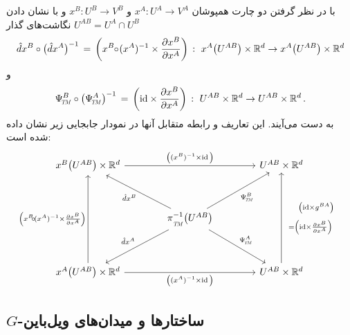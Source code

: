 با در نظر گرفتن دو چارت همپوشان $x^A: U^A \to V^A$ و $x^B: U^B \to V^B$ و با نشان دادن $U^{AB} = U^A \cap U^B$ نگاشت‌های گذار
\begin{align}
	\hat{d}x^B \circ \big( \hat{d}x^A \big)^{-1} \,=\,
	\left( x^B \mkern-5mu\circ\mkern-3mu (x^A)^{-1} \times \frac{\partial x^B}{\partial x^A} \right)
	\,:\ x^A\big( U^{AB}\big) \times \mathbb{R}^d \to x^A\big( U^{AB}\big) \times \mathbb{R}^d
\end{align}
و
\begin{align}
	\PsiTM^B \circ \big( \PsiTM^A \big)^{-1} \,=\,
	\left( \id \times \frac{\partial x^B}{\partial x^A} \right)
	\,:\ U^{AB} \times \R^d \to U^{AB} \times \R^d \,.
\end{align}
به دست می‌آیند. این تعاریف و رابطه متقابل آنها در نمودار جابجایی زیر نشان داده شده است:
\begin{equation}\label{cd:coordinate_basis_bundle_trivialization_transition}
	\begin{tikzcd}[row sep=3.5em, column sep=4em]
		x^B\big(U^{AB}\big) \times \R^d
		\arrow[rr, "{\big( (x^B)^{-1} \times \id \,\big)}"]
		& &
		U^{AB} \times \R^d
		\\
		&
		\piTM^{-1}\big(U^{AB}\big)
		\arrow[ul, "{\hat{d}x^B}"]
		\arrow[dl, "{\hat{d}x^A}"']
		\arrow[ur, "{\PsiTM^B}"']
		\arrow[dr, "{\PsiTM^A}"]
		\\
		x^A\big(U^{AB}\big) \times \R^d
		\arrow[rr, "{\big( (x^A)^{-1} \times \id \,\big)}"']
		\arrow[uu, "{\pig( x^B \mkern-5mu\circ\mkern-3mu (x^A)^{-1} \times \frac{\partial x^B}{\partial x^A} \pig)}"]
		&&
		U^{AB} \times \R^d
		\arrow[uu, "{
			$\begin{array}{l}
				\hspace*{10pt}
				\big(\id \times g^{BA} \big)
				\\ \rule{0pt}{16pt}
				= \pig( \id \times \frac{\partial x^B}{\partial x^A} \pig)
			\end{array}$
		}"' align = left]
	\end{tikzcd}
\end{equation}




















\subsection{$G$-ساختارها و میدان‌های ویل‌باین}
\label{apx:vielbein_fields}


